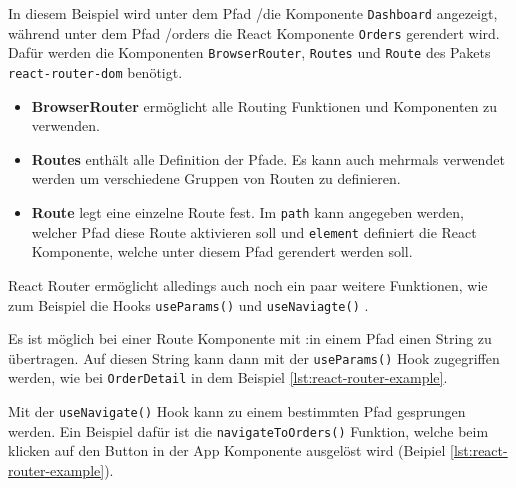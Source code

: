 \documentclass[a4paper,12pt]{report}
\begin{document}
In diesem Beispiel wird unter dem Pfad \glqq /\grqq{ }die Komponente \verb|Dashboard| angezeigt, während unter dem Pfad \glqq /orders\grqq{ } die React Komponente \verb|Orders| gerendert wird. Dafür werden die Komponenten \verb|BrowserRouter|, \verb|Routes| und \verb|Route| des Pakets \verb|react-router-dom| benötigt.
\begin{itemize}
\item \textbf{BrowserRouter} ermöglicht alle Routing Funktionen und Komponenten zu verwenden.
\item \textbf{Routes} enthält alle Definition der Pfade. Es kann auch mehrmals verwendet werden um verschiedene Gruppen von Routen zu definieren.
\item \textbf{Route} legt eine einzelne Route fest. Im \verb|path| kann angegeben werden, welcher Pfad diese Route aktivieren soll und \verb|element| definiert die React Komponente, welche unter diesem Pfad gerendert werden soll.
\end{itemize}

React Router ermöglicht alledings auch noch ein paar weitere Funktionen, wie zum Beispiel die Hooks \verb|useParams()| und \verb|useNaviagte()| \cite{react-key-concepts}. 

Es ist möglich bei einer Route Komponente mit \glqq :\grqq{ }in einem Pfad einen String zu übertragen. Auf diesen String kann dann mit der \verb|useParams()| Hook zugegriffen werden, wie bei \verb|OrderDetail| in dem Beispiel \ref{lst:react-router-example}. 

Mit der \verb|useNavigate()| Hook kann zu einem bestimmten Pfad gesprungen werden. Ein Beispiel dafür ist die \verb|navigateToOrders()| Funktion, welche beim klicken auf den Button in der App Komponente ausgelöst wird (Beipiel \ref{lst:react-router-example}).
\end{document}
